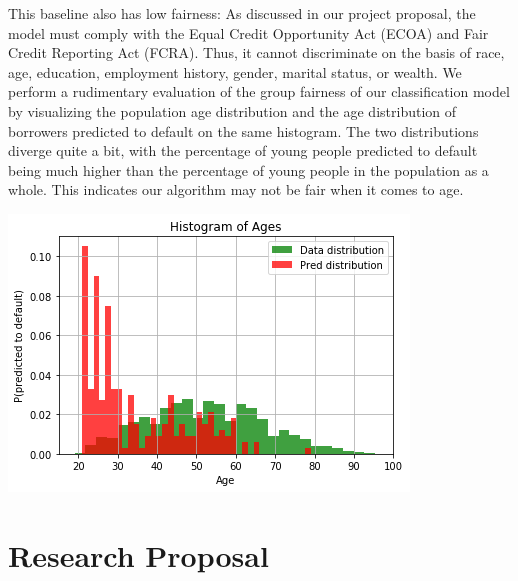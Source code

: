 \documentclass[11pt, margin=1in]{article}
\begin{document}
This baseline also has low fairness: As discussed in our project proposal, the model must comply with the Equal Credit Opportunity Act (ECOA) and Fair Credit Reporting Act (FCRA). Thus, it cannot discriminate on the basis of race, age, education, employment history, gender, marital status, or wealth. We perform a rudimentary evaluation of the group fairness of our classification model by visualizing the population age distribution and the age distribution of borrowers predicted to default on the same histogram. The two distributions diverge quite a bit, with the percentage of young people predicted to default being much higher than the percentage of young people in the population as a whole. This indicates our algorithm may not be fair when it comes to age.

\begin{center}
	\includegraphics[width=0.9\linewidth]{age-fairness}
\end{center}

\section{Research Proposal}
\end{document}
